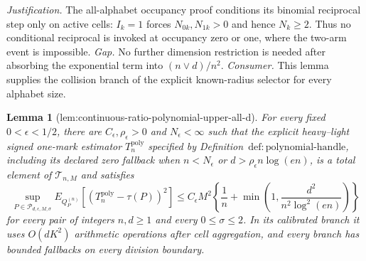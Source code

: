 \documentclass{article}
\newtheorem{lemma}{Lemma}
\begin{document}
\par\smallskip\noindent \textit{Justification.} The all-alphabet occupancy proof conditions its binomial reciprocal step only on active cells: \(I_k=1\) forces \(N_{0k},N_{1k}>0\) and hence \(N_k\ge2\). Thus no conditional reciprocal is invoked at occupancy zero or one, where the two-arm event is impossible. \textit{Gap.} No further dimension restriction is needed after absorbing the exponential term into \((n\vee d)/n^2\). \textit{Consumer.} This lemma supplies the collision branch of the explicit known-radius selector for every alphabet size.

\begin{lemma}[lem:continuous-ratio-polynomial-upper-all-d]\label{lem:continuous-ratio-polynomial-upper-all-d}
For every fixed \(0<\epsilon<1/2\), there are \(C_{\epsilon},\rho_{\epsilon}>0\) and \(N_{\epsilon}<\infty\) such that the explicit heavy--light signed one-mark estimator \(T_n^{\mathrm{poly}}\) specified by Definition~\(\mathrm{def:polynomial\text{-}handle}\), including its declared zero fallback when \(n<N_{\epsilon}\) or \(d>\rho_{\epsilon}n\log(en)\), is a total element of \(\mathcal T_{n,M}\) and satisfies
\[
 \sup_{P\in\mathcal P_{d,\epsilon,M,\sigma}}
 E_{Q_P^{(n)}}[(T_n^{\mathrm{poly}}-\tau(P))^2]
 \le C_{\epsilon}M^2\left\{\frac1n+
 \min\left(1,\frac{d^2}{n^2\log^2(en)}\right)\right\}
\]
for every pair of integers \(n,d\ge1\) and every \(0\le\sigma\le2\).  In its calibrated branch it uses \(O(dK^2)\) arithmetic operations after cell aggregation, and every branch has bounded fallbacks on every division boundary.
\end{lemma}
\end{document}
